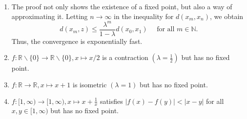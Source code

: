 \documentclass[a4paper]{article}
\begin{document}
\begin{remark}
\begin{enumerate}
    \item The proof not only shows the existence of a fixed point, but also a way of approximating it. Letting $n \rightarrow \infty$ in the inequality for $d\left(x_m, x_n\right)$, we obtain
    \[
    d\left(x_m, z\right) \leqslant \frac{\lambda^m}{1-\lambda} d\left(x_0, x_1\right) \quad \text { for all } m \in \mathbb{N}.
    \]
    Thus, the convergence is exponentially fast.
    \item $f: \mathbb{R} \backslash\{0\} \rightarrow \mathbb{R} \backslash\{0\}, x \mapsto x / 2$ is a contraction $\left(\lambda=\frac{1}{2}\right)$ but has no fixed point.
    \item $f: \mathbb{R} \rightarrow \mathbb{R}, x \mapsto x+1$ is isometric $(\lambda=1)$ but has no fixed point.
    \item $f:[1, \infty) \rightarrow[1, \infty), x \mapsto x+\frac{1}{x}$ satisfies $|f(x)-f(y)|<|x-y|$ for all $x, y \in[1, \infty)$ but has no fixed point.
\end{enumerate}
\end{remark}
\end{document}
